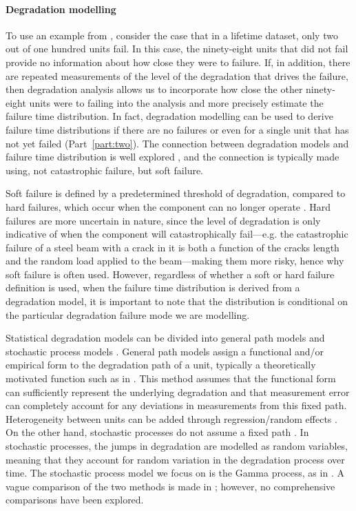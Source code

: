 \paragraph*{Degradation modelling} 

To use an example from \citet{Meeker2022}, consider the case that in a lifetime dataset, only two out of one hundred units fail. In this case, the ninety-eight units that did not fail provide no information about how close they were to failure. If, in addition, there are repeated measurements of the level of the degradation that drives the failure, then degradation analysis allows us to incorporate how close the other ninety-eight units were to failing into the analysis and more precisely estimate the failure time distribution. In fact, degradation modelling can be used to derive failure time distributions if there are no failures or even for a single unit that has not yet failed (Part~\ref{part:two}). The connection between degradation models and failure time distribution is well explored \citep{lu1996,bae2007,Meeker2022,lawless2004}, and the connection is typically made using, not catastrophic failure, but soft failure.

Soft failure is defined by a predetermined threshold of degradation, compared to hard failures, which occur when the component can no longer operate \citep{hamada2008}. Hard failures are more uncertain in nature, since the level of degradation is only indicative of when the component will catastrophically fail---e.g. the catastrophic failure of a steel beam with a crack in it is both a function of the cracks length and the random load applied to the beam---making them more risky, hence why soft failure is often used. However, regardless of whether a soft or hard failure definition is used, when the failure time distribution is derived from a degradation model, it is important to note that the distribution is conditional on the particular degradation failure mode we are modelling.

Statistical degradation models can be divided into general path models and stochastic process models \citep{pandey2006, si2011}. General path models assign a functional and/or empirical form to the degradation path of a unit, typically a theoretically motivated function such as in \citet{robinson2000}. This method assumes that the functional form can sufficiently represent the underlying degradation and that measurement error can completely account for any deviations in measurements from this fixed path. Heterogeneity between units can be added through regression/random effects \citep{robinson2000}. On the other hand, stochastic processes do not assume a fixed path \citep{pandey2006}. In stochastic processes, the jumps in degradation are modelled as random variables, meaning that they account for random variation in the degradation process over time. The stochastic process model we focus on is the Gamma process, as in \citet{lawless2004}. A vague comparison of the two methods is made in \citet{ye2015}; however, no comprehensive comparisons have been explored.


